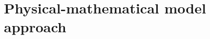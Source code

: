 \documentclass[
oneside,
a4paper,
12pt,
titlepage]
{article}
\begin{document}

\newpage

\newpage

\newpage
\pagestyle{standard}


% 
% 

\section{Physical-mathematical model approach}


\newpage

\end{document}
